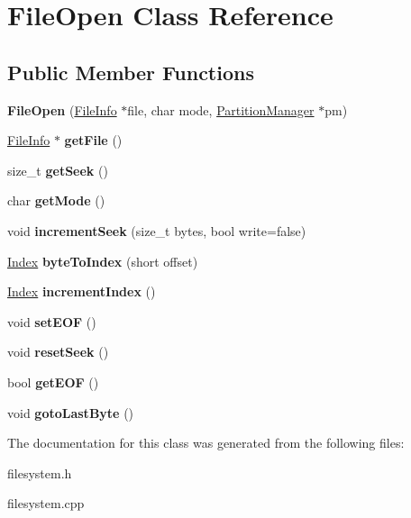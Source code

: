 \hypertarget{classFileOpen}{}\section{File\+Open Class Reference}
\label{classFileOpen}
\subsection*{Public Member Functions}
\begin{DoxyCompactItemize}
\item 
\mbox{\label{classFileOpen_a387c8980a812856a3633ff162c1c1af4}} 
{\bfseries File\+Open} (\mbox{\hyperlink{classFileInfo}{File\+Info}} $\ast$file, char mode, \mbox{\hyperlink{classPartitionManager}{Partition\+Manager}} $\ast$pm)
\item 
\mbox{\label{classFileOpen_a811022e6d3aeb87197f606f96ea48b4d}} 
\mbox{\hyperlink{classFileInfo}{File\+Info}} $\ast$ {\bfseries get\+File} ()
\item 
\mbox{\label{classFileOpen_a04e80a75040ac13609bbc05854ba4627}} 
size\+\_\+t {\bfseries get\+Seek} ()
\item 
\mbox{\label{classFileOpen_a2e0be6fcbcabe3b84c494aa3686d0a53}} 
char {\bfseries get\+Mode} ()
\item 
\mbox{\label{classFileOpen_a613c5b8b0fb9e82419c00577f19afd47}} 
void {\bfseries increment\+Seek} (size\+\_\+t bytes, bool write=false)
\item 
\mbox{\label{classFileOpen_ace2f20f95830ff64e7da5806b856a01e}} 
\mbox{\hyperlink{structindex}{Index}} {\bfseries byte\+To\+Index} (short offset)
\item 
\mbox{\label{classFileOpen_acf54611ade567a58ea0078e24e2d245a}} 
\mbox{\hyperlink{structindex}{Index}} {\bfseries increment\+Index} ()
\item 
\mbox{\label{classFileOpen_aa98c19c8afed7c9b5942ce4e63fc7879}} 
void {\bfseries set\+E\+OF} ()
\item 
\mbox{\label{classFileOpen_aebc4cc325efd14978893ccc81b6eea51}} 
void {\bfseries reset\+Seek} ()
\item 
\mbox{\label{classFileOpen_af14a37e4bb198d00105fb6eaac065098}} 
bool {\bfseries get\+E\+OF} ()
\item 
\mbox{\label{classFileOpen_aa3a7561a9d3bea0b29d958b58f691005}} 
void {\bfseries goto\+Last\+Byte} ()
\end{DoxyCompactItemize}


The documentation for this class was generated from the following files\+:\begin{DoxyCompactItemize}
\item 
filesystem.\+h\item 
filesystem.\+cpp\end{DoxyCompactItemize}
